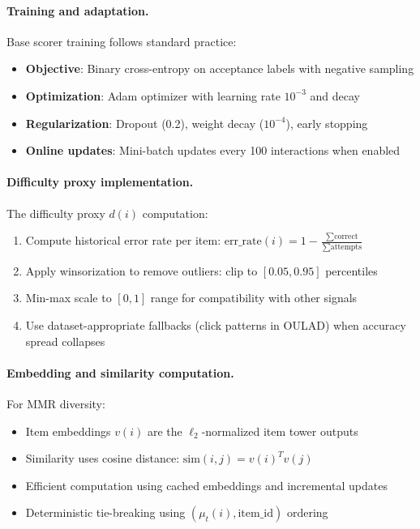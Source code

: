\paragraph{Training and adaptation.} Base scorer training follows standard practice:
\begin{itemize}
  \item \textbf{Objective}: Binary cross-entropy on acceptance labels with negative sampling
  \item \textbf{Optimization}: Adam optimizer with learning rate $10^{-3}$ and decay
  \item \textbf{Regularization}: Dropout (0.2), weight decay ($10^{-4}$), early stopping
  \item \textbf{Online updates}: Mini-batch updates every 100 interactions when enabled
\end{itemize}

\paragraph{Difficulty proxy implementation.} The difficulty proxy $d(i)$ computation:
\begin{enumerate}
  \item Compute historical error rate per item: $\text{err\_rate}(i) = 1 - \frac{\sum \text{correct}}{\sum \text{attempts}}$
  \item Apply winsorization to remove outliers: clip to $[0.05, 0.95]$ percentiles
  \item Min-max scale to $[0,1]$ range for compatibility with other signals
  \item Use dataset-appropriate fallbacks (click patterns in OULAD) when accuracy spread collapses
\end{enumerate}

\paragraph{Embedding and similarity computation.} For MMR diversity:
\begin{itemize}
  \item Item embeddings $v(i)$ are the $\ell_2$-normalized item tower outputs
  \item Similarity uses cosine distance: $\text{sim}(i,j) = v(i)^T v(j)$
  \item Efficient computation using cached embeddings and incremental updates
  \item Deterministic tie-breaking using $(\mu_t(i), \text{item\_id})$ ordering
\end{itemize}

